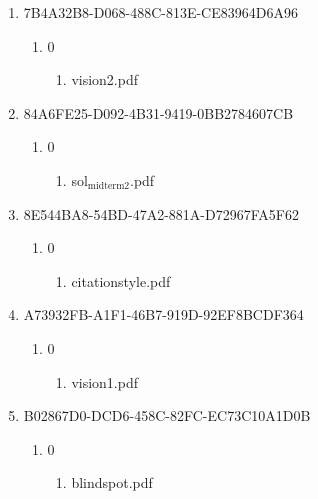 \documentclass[11pt]{article}
\begin{document}
\begin{enumerate}
\begin{enumerate}
\begin{enumerate}
\begin{enumerate}
\begin{enumerate}
\begin{enumerate}
\begin{enumerate}
\begin{enumerate}
\begin{enumerate}
\begin{enumerate}
\begin{enumerate}
\item 7B4A32B8-D068-488C-813E-CE83964D6A96
\label{sec-1-1-1-1-7-3-24-12-1-1-1-1-1-9}
\begin{enumerate}
\item 0
\label{sec-1-1-1-1-7-3-24-12-1-1-1-1-1-9-1}
\begin{enumerate}
\item vision2.pdf
\label{sec-1-1-1-1-7-3-24-12-1-1-1-1-1-9-1-1}
\end{enumerate}
\end{enumerate}

\item 84A6FE25-D092-4B31-9419-0BB2784607CB
\label{sec-1-1-1-1-7-3-24-12-1-1-1-1-1-10}
\begin{enumerate}
\item 0
\label{sec-1-1-1-1-7-3-24-12-1-1-1-1-1-10-1}
\begin{enumerate}
\item sol$_{\text{midterm2}}$.pdf
\label{sec-1-1-1-1-7-3-24-12-1-1-1-1-1-10-1-1}
\end{enumerate}
\end{enumerate}

\item 8E544BA8-54BD-47A2-881A-D72967FA5F62
\label{sec-1-1-1-1-7-3-24-12-1-1-1-1-1-11}
\begin{enumerate}
\item 0
\label{sec-1-1-1-1-7-3-24-12-1-1-1-1-1-11-1}
\begin{enumerate}
\item citationstyle.pdf
\label{sec-1-1-1-1-7-3-24-12-1-1-1-1-1-11-1-1}
\end{enumerate}
\end{enumerate}

\item A73932FB-A1F1-46B7-919D-92EF8BCDF364
\label{sec-1-1-1-1-7-3-24-12-1-1-1-1-1-12}
\begin{enumerate}
\item 0
\label{sec-1-1-1-1-7-3-24-12-1-1-1-1-1-12-1}
\begin{enumerate}
\item vision1.pdf
\label{sec-1-1-1-1-7-3-24-12-1-1-1-1-1-12-1-1}
\end{enumerate}
\end{enumerate}

\item B02867D0-DCD6-458C-82FC-EC73C10A1D0B
\label{sec-1-1-1-1-7-3-24-12-1-1-1-1-1-13}
\begin{enumerate}
\item 0
\label{sec-1-1-1-1-7-3-24-12-1-1-1-1-1-13-1}
\begin{enumerate}
\item blindspot.pdf
\label{sec-1-1-1-1-7-3-24-12-1-1-1-1-1-13-1-1}
\end{enumerate}
\end{enumerate}


\end{enumerate}
\end{enumerate}
\end{enumerate}
\end{enumerate}
\end{enumerate}
\end{enumerate}
\end{enumerate}
\end{enumerate}
\end{enumerate}
\end{enumerate}
\end{enumerate}
\end{document}
